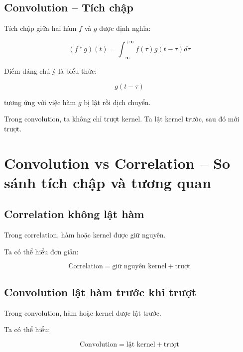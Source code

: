 \subsection{Convolution -- Tích chập}

Tích chập giữa hai hàm $f$ và $g$ được định nghĩa:

\[
    (f*g)(t)
    =
    \int_{-\infty}^{+\infty}
    f(\tau)g(t-\tau)d\tau
\]

Điểm đáng chú ý là biểu thức:

\[
    g(t-\tau)
\]

tương ứng với việc hàm $g$ bị lật rồi dịch chuyển.

\begin{luuy}
Trong convolution, ta không chỉ trượt kernel. Ta lật kernel trước, sau đó mới trượt.
\end{luuy}

\section{Convolution vs Correlation -- So sánh tích chập và tương quan}

\subsection{Correlation không lật hàm}

Trong correlation, hàm hoặc kernel được giữ nguyên.

Ta có thể hiểu đơn giản:

\[
    \text{Correlation}
    =
    \text{giữ nguyên kernel}
    +
    \text{trượt}
\]

\subsection{Convolution lật hàm trước khi trượt}

Trong convolution, hàm hoặc kernel được lật trước.

Ta có thể hiểu:

\[
    \text{Convolution}
    =
    \text{lật kernel}
    +
    \text{trượt}
\]

\begin{center}
\end{center}

